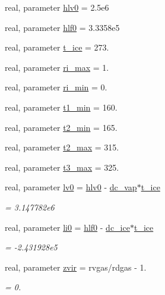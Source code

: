 \begin{DoxyCompactItemize}
real, parameter \hyperlink{classfv__sg__mod_a3b888bbbc28cceecf2d4157bc40f7e97}{hlv0} = 2.\-5e6
\item 
real, parameter \hyperlink{classfv__sg__mod_a0ef6edb91d65d124d913ef57e02e588c}{hlf0} = 3.\-3358e5
\item 
real, parameter \hyperlink{classfv__sg__mod_a46dc612b8ea952b410d9388e7734b1dc}{t\-\_\-ice} = 273.
\item 
real, parameter \hyperlink{classfv__sg__mod_af3111561e3086d6011cf81c50467d561}{ri\-\_\-max} = 1.
\item 
real, parameter \hyperlink{classfv__sg__mod_a5a016eeeb112ccb46087279e37698ecb}{ri\-\_\-min} = 0.
\item 
real, parameter \hyperlink{classfv__sg__mod_afe8eeeb134260859c1ff38fe74557123}{t1\-\_\-min} = 160.
\item 
real, parameter \hyperlink{classfv__sg__mod_ad9aa2baea22c517457629ab6821992fa}{t2\-\_\-min} = 165.
\item 
real, parameter \hyperlink{classfv__sg__mod_a17bd270ea0dba7816112efe5d704896c}{t2\-\_\-max} = 315.
\item 
real, parameter \hyperlink{classfv__sg__mod_a3d2e9d81e47d9e0be757a3b2978f00f3}{t3\-\_\-max} = 325.
\item 
real, parameter \hyperlink{classfv__sg__mod_a81ad127cb875ed67c0b2b72faddbd28b}{lv0} = \hyperlink{classfv__sg__mod_a3b888bbbc28cceecf2d4157bc40f7e97}{hlv0} -\/ \hyperlink{classfv__sg__mod_a801d775ff0bd22525d3bdbfdbaa25a93}{dc\-\_\-vap}$\ast$\hyperlink{classfv__sg__mod_a46dc612b8ea952b410d9388e7734b1dc}{t\-\_\-ice}
\begin{DoxyCompactList}\small\item\em = 3.\-147782e6 \end{DoxyCompactList}\item 
real, parameter \hyperlink{classfv__sg__mod_a5c833712f86de131c6bdc48cac46909e}{li0} = \hyperlink{classfv__sg__mod_a0ef6edb91d65d124d913ef57e02e588c}{hlf0} -\/ \hyperlink{classfv__sg__mod_a78cb86127e174c40e9c96f9ad386cd51}{dc\-\_\-ice}$\ast$\hyperlink{classfv__sg__mod_a46dc612b8ea952b410d9388e7734b1dc}{t\-\_\-ice}
\begin{DoxyCompactList}\small\item\em = -\/2.\-431928e5 \end{DoxyCompactList}\item 
real, parameter \hyperlink{classfv__sg__mod_a4d8e998e436b110102a6723af127d4df}{zvir} = rvgas/rdgas -\/ 1.
\begin{DoxyCompactList}\small\item\em = 0. \end{DoxyCompactList}\item 

\end{DoxyCompactItemize}
